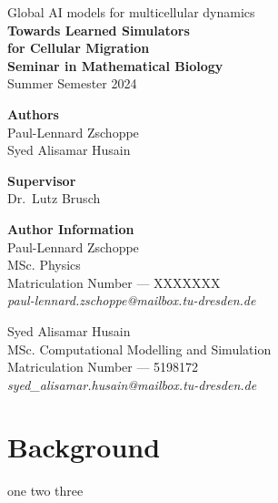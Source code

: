 \documentclass[a4paper,10pt]{article}
\begin{document}
    \begin{titlepage}
        \begin{center}
            
            \vspace{10em}
            {\LARGE Global AI models for multicellular dynamics} \\ 
            {\huge\bfseries Towards Learned Simulators\\for Cellular Migration}\\
            
            \vspace{5em}
            {\large\bfseries Seminar in Mathematical Biology}\\
            {\large Summer Semester 2024}
            
            \vspace{12em}
            {\bfseries Authors} \\ 
            Paul-Lennard Zschoppe\\
            Syed Alisamar Husain
            
            \vspace{5em}
            {\bfseries Supervisor} \\ Dr.\ Lutz Brusch
        \end{center}
    \end{titlepage}
    \pagebreak

    \tableofcontents
    \listoffigures
    \vspace{3em}
    {\noindent\Large\bfseries Author Information \vspace{0.75em}}\\
    \noindent\large Paul-Lennard Zschoppe\\
    {\small MSc. Physics}\\
    {\small Matriculation Number --- XXXXXXX}\\
    {\it\small paul-lennard.zschoppe@mailbox.tu-dresden.de}\\\vspace{0.5em}
    
    \noindent\large Syed Alisamar Husain\\
    {\small MSc. Computational Modelling and Simulation}\\
    {\small Matriculation Number --- 5198172}\\
    {\it\small syed\_alisamar.husain@mailbox.tu-dresden.de}
    \pagebreak

    \section{Background}

    one \cite{minartz_cpm}
    two \cite{minartz_epns}
    three \cite{morpheus}

    \newpage
    
    
\end{document}
